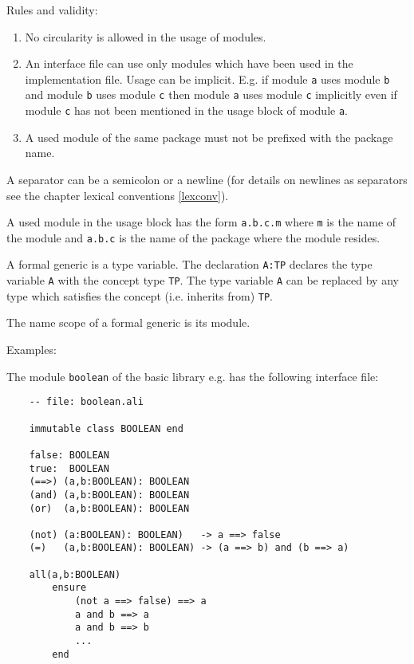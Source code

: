 \noindent Rules and validity:
\begin{enumerate}
\item No circularity is allowed in the usage of modules.

\item An interface file can use only modules which have been used in the
implementation file. Usage can be implicit. E.g. if module \lstinline!a! uses
module \lstinline!b!  and module \lstinline!b! uses module \lstinline!c! then
module \lstinline!a! uses module \lstinline!c! implicitly even if module
\lstinline!c! has not been mentioned in the usage block of module
\lstinline!a!.

\item A used module of the same package must not be prefixed with the package
  name.
\end{enumerate}

A separator can be a semicolon or a newline (for details on newlines as
separators see the chapter lexical conventions \ref{lexconv}).

A used module in the usage block has the form \lstinline!a.b.c.m! where
\lstinline!m! is the name of the module and \lstinline!a.b.c! is the name of
the package where the module resides.

A formal generic is a type variable. The declaration \lstinline!A:TP! declares
the type variable \lstinline!A! with the concept type \lstinline!TP!. The type
variable \lstinline!A! can be replaced by any type which satisfies the concept
(i.e. inherits from) \lstinline!TP!.

The name scope of a formal generic is its module.

\noindent Examples:

The module \lstinline!boolean! of the basic library e.g. has the following
interface file:

\begin{lstlisting}
    -- file: boolean.ali

    immutable class BOOLEAN end

    false: BOOLEAN
    true:  BOOLEAN
    (==>) (a,b:BOOLEAN): BOOLEAN
    (and) (a,b:BOOLEAN): BOOLEAN
    (or)  (a,b:BOOLEAN): BOOLEAN

    (not) (a:BOOLEAN): BOOLEAN)   -> a ==> false
    (=)   (a,b:BOOLEAN): BOOLEAN) -> (a ==> b) and (b ==> a)
    
    all(a,b:BOOLEAN)
        ensure
            (not a ==> false) ==> a
            a and b ==> a
            a and b ==> b
            ...
        end
\end{lstlisting}

